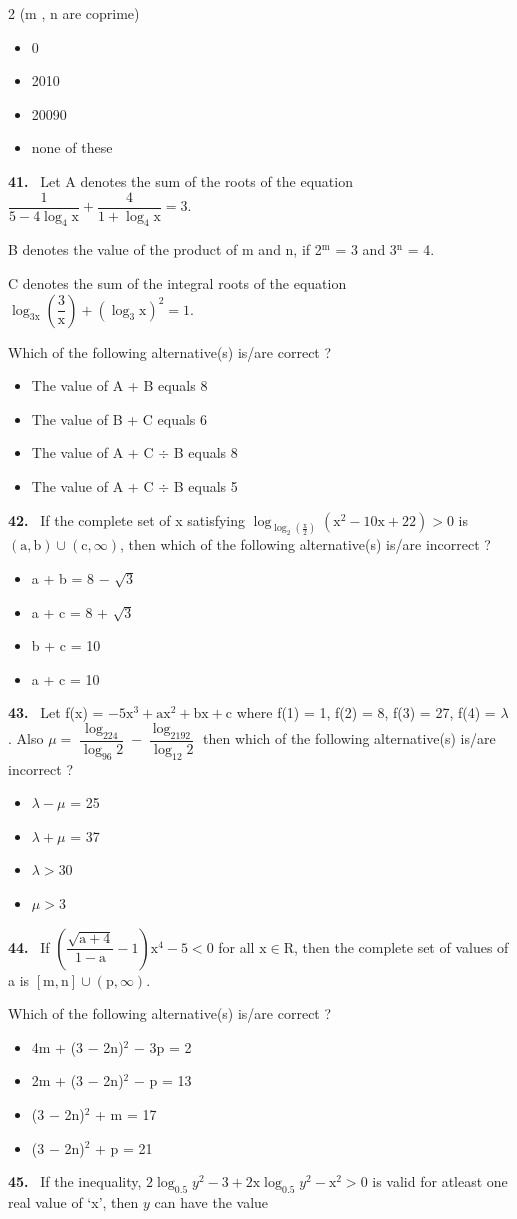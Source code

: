 \documentclass[10pt]{extarticle}
\newcommand{\qn}[1]{\par\smallskip\noindent\textbf{#1.}~}
\newenvironment{qoptions}{\begin{itemize}[leftmargin=1.8em,itemsep=1pt,topsep=2pt,label={}]}{\end{itemize}}
\newcommand{\opt}[2]{\item[(#1)] #2}
\begin{document}
\begin{multicols}{2}
(m , n are coprime)
\begin{qoptions}
\opt{A}{0}
\opt{B}{2010}
\opt{C}{20090}
\opt{D}{none of these}
\end{qoptions}
\qn{41} Let A denotes the sum of the roots of the equation $\dfrac1{5-4\log_4\mathrm x}+\dfrac4{1+\log_4\mathrm x}=3$.\par
B denotes the value of the product of m and n, if 2$^\mathrm m$ = 3 and 3$^\mathrm n$ = 4.\par
C denotes the sum of the integral roots of the equation $\log_{3\mathrm x}\left(\dfrac3{\mathrm x}\right)+\left(\log_3\mathrm x\right)^2=1$.\par
Which of the following alternative(s) is/are correct ?
\begin{qoptions}
\opt{A}{The value of A + B equals 8}
\opt{B}{The value of B + C equals 6}
\opt{C}{The value of A + C $\div$ B equals 8}
\opt{D}{The value of A + C $\div$ B equals 5}
\end{qoptions}
\qn{42} If the complete set of x satisfying $\log_{\log_2\left(\frac{\mathrm x}2\right)}\left(\mathrm x^2-10\mathrm x+22\right)>0$ is $(\mathrm a,\mathrm b)\cup(\mathrm c,\infty)$, then which of the following alternative(s) is/are incorrect ?
\begin{qoptions}
\opt{A}{a + b = 8 $-$ $\sqrt3$}
\opt{B}{a + c = 8 + $\sqrt3$}
\opt{C}{b + c = 10}
\opt{D}{a + c = 10}
\end{qoptions}
\qn{43} Let f(x) = $-5\mathrm x^3+\mathrm{ax}^2+\mathrm{bx}+\mathrm c$ where f(1) = 1, f(2) = 8, f(3) = 27, f(4) = $\lambda$. Also $\mu=\dfrac{\log_224}{\log_{96}2}-\dfrac{\log_2192}{\log_{12}2}$ then which of the following alternative(s) is/are incorrect ?
\begin{qoptions}
\opt{A}{$\lambda-\mu$ = 25}
\opt{B}{$\lambda+\mu$ = 37}
\opt{C}{$\lambda>30$}
\opt{D}{$\mu>3$}
\end{qoptions}
\qn{44} If $\left(\dfrac{\sqrt{\mathrm a+4}}{1-\mathrm a}-1\right)\mathrm x^4-5<0$ for all $\mathrm x\in\mathrm R$, then the complete set of values of a is $[\mathrm m,\mathrm n]\cup(\mathrm p,\infty)$.\par
Which of the following alternative(s) is/are correct ?
\begin{qoptions}
\opt{A}{4m + (3 $-$ 2n)$^2$ $-$ 3p = 2}
\opt{B}{2m + (3 $-$ 2n)$^2$ $-$ p = 13}
\opt{C}{(3 $-$ 2n)$^2$ + m = 17}
\opt{D}{(3 $-$ 2n)$^2$ + p = 21}
\end{qoptions}
\qn{45} If the inequality, $2\log_{0.5}y^2-3+2\mathrm x\log_{0.5}y^2-\mathrm x^2>0$ is valid for atleast one real value of `x', then $y$ can have the value

\end{multicols}
\end{document}
